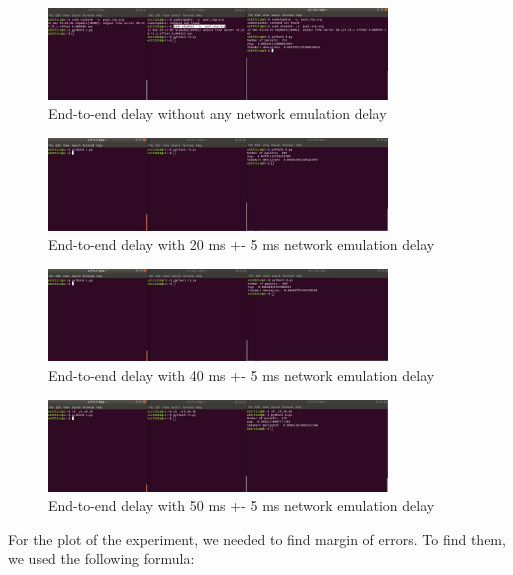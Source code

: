 \documentclass[conference]{IEEEtran}
\begin{document}
\begin{figure}[htp]
    \centering
    \includegraphics[width=9cm]{bibliography/delay_0.jpeg}
    \caption{End-to-end delay without any network emulation delay}
    \label{fig:delay_0}
\end{figure}

\begin{figure}[htp]
    \centering
    \includegraphics[width=9cm]{bibliography/delay_20.jpeg}
    \caption{End-to-end delay with 20 ms +- 5 ms network emulation delay}
    \label{fig:delay_20}
\end{figure}

\begin{figure}[htp]
    \centering
    \includegraphics[width=9cm]{bibliography/delay_40.jpeg}
    \caption{End-to-end delay with 40 ms +- 5 ms network emulation delay}
    \label{fig:delay_40}
\end{figure}

\begin{figure}[htp]
    \centering
    \includegraphics[width=9cm]{bibliography/delay_50.jpeg}
    \caption{End-to-end delay with 50 ms +- 5 ms network emulation delay}
    \label{fig:delay_50}
\end{figure} 

For the plot of the experiment, we needed to find margin of errors. To find them, we used the following formula: \\
\end{document}
